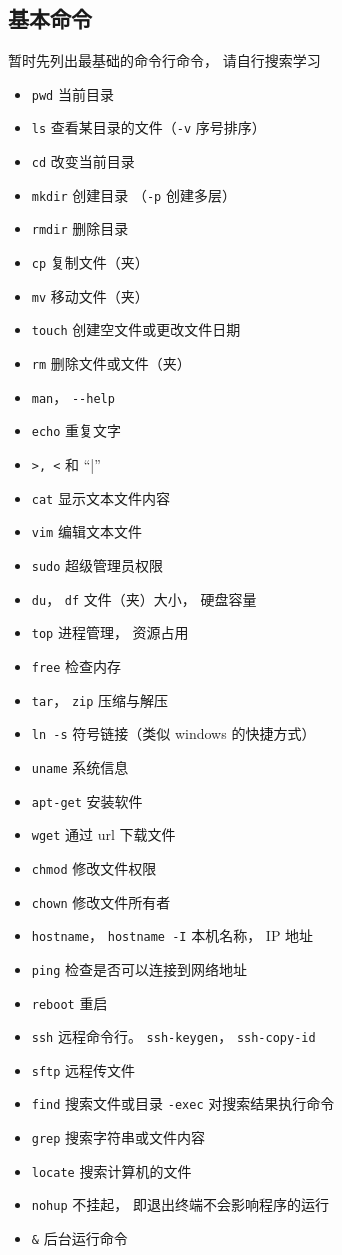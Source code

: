 \subsection{基本命令}
暂时先列出最基础的命令行命令， 请自行搜索学习
\begin{itemize}
\item \verb|pwd| 当前目录
\item \verb|ls| 查看某目录的文件（\verb|-v| 序号排序）
\item \verb|cd| 改变当前目录
\item \verb|mkdir| 创建目录 （\verb|-p| 创建多层）
\item \verb|rmdir| 删除目录
\item \verb|cp| 复制文件（夹）
\item \verb|mv| 移动文件（夹）
\item \verb|touch| 创建空文件或更改文件日期
\item \verb|rm| 删除文件或文件（夹）
\item \verb|man|， \verb|--help|
\item \verb|echo| 重复文字
\item \verb|>, <| 和 “|”
\item \verb|cat| 显示文本文件内容
\item \verb|vim| 编辑文本文件
\item \verb|sudo| 超级管理员权限
\item \verb|du|， \verb|df| 文件（夹）大小， 硬盘容量
\item \verb|top| 进程管理， 资源占用
\item \verb|free| 检查内存
\item \verb|tar|， \verb|zip| 压缩与解压
\item \verb|ln -s| 符号链接（类似 windows 的快捷方式）
\item \verb|uname| 系统信息
\item \verb|apt-get| 安装软件
\item \verb|wget| 通过 url 下载文件
\item \verb|chmod| 修改文件权限
\item \verb|chown| 修改文件所有者
\item \verb|hostname|， \verb|hostname -I| 本机名称， IP 地址
\item \verb|ping| 检查是否可以连接到网络地址
\item \verb|reboot| 重启
\item \verb|ssh| 远程命令行。 \verb|ssh-keygen|， \verb|ssh-copy-id|
\item \verb|sftp| 远程传文件
\item \verb|find| 搜索文件或目录 \verb|-exec| 对搜索结果执行命令
\item \verb|grep| 搜索字符串或文件内容
\item \verb|locate| 搜索计算机的文件
\item \verb|nohup| 不挂起， 即退出终端不会影响程序的运行
\item \verb|&| 后台运行命令
\end{itemize}

